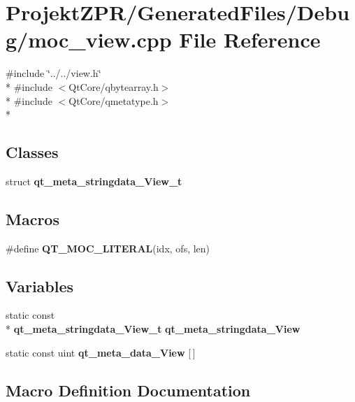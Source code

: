 \section{Projekt\-Z\-P\-R/\-Generated\-Files/\-Debug/moc\-\_\-view.cpp File Reference}
\label{_debug_2moc__view_8cpp}
{\ttfamily \#include \char`\"{}../../view.\-h\char`\"{}}\\*
{\ttfamily \#include $<$Qt\-Core/qbytearray.\-h$>$}\\*
{\ttfamily \#include $<$Qt\-Core/qmetatype.\-h$>$}\\*
\subsection*{Classes}
\begin{DoxyCompactItemize}
\item 
struct {\bf qt\-\_\-meta\-\_\-stringdata\-\_\-\-View\-\_\-t}
\end{DoxyCompactItemize}
\subsection*{Macros}
\begin{DoxyCompactItemize}
\item 
\#define {\bf Q\-T\-\_\-\-M\-O\-C\-\_\-\-L\-I\-T\-E\-R\-A\-L}(idx, ofs, len)
\end{DoxyCompactItemize}
\subsection*{Variables}
\begin{DoxyCompactItemize}
\item 
static const \\*
{\bf qt\-\_\-meta\-\_\-stringdata\-\_\-\-View\-\_\-t} {\bf qt\-\_\-meta\-\_\-stringdata\-\_\-\-View}
\item 
static const uint {\bf qt\-\_\-meta\-\_\-data\-\_\-\-View} [$\,$]
\end{DoxyCompactItemize}


\subsection{Macro Definition Documentation}
